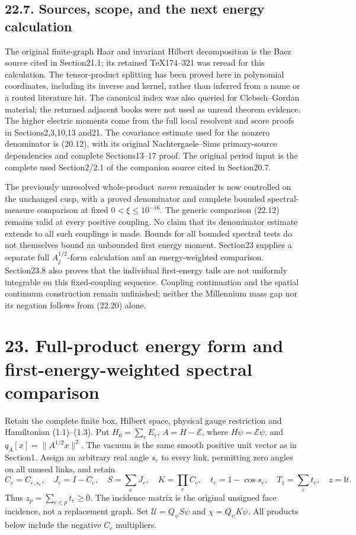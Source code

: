 \documentclass[
]{article}
\begin{document}
\subsection{22.7. Sources, scope, and the next energy
calculation}\label{sources-scope-and-the-next-energy-calculation}

The original finite-graph Haar and invariant Hilbert decomposition is
the Baez source cited in Section21.1; its retained TeX174--321 was
reread for this calculation. The tensor-product splitting has been
proved here in polynomial coordinates, including its inverse and kernel,
rather than inferred from a name or a routed literature hit. The
canonical index was also queried for Clebsch--Gordan material; the
returned adjacent books were not used as unread theorem evidence. The
higher electric moments come from the full local resolvent and score
proofs in Sections2,3,10,13 and21. The covariance estimate used for the
nonzero denominator is (20.12), with its original Nachtergaele--Sims
primary-source dependencies and complete Sections13--17 proof. The
original period input is the complete used Section2/2.1 of the companion
source cited in Section20.7.

The previously unresolved whole-product \emph{norm} remainder is now
controlled on the unchanged cusp, with a proved denominator and complete
bounded spectral-measure comparison at fixed \(0<\xi\le10^{-16}\). The
generic comparison (22.12) remains valid at every positive coupling. No
claim that its denominator estimate extends to all such couplings is
made. Bounds for all bounded spectral tests do not themselves bound an
unbounded first energy moment. Section23 supplies a separate full
\(A_j^{1/2}\)-form calculation and an energy-weighted comparison.
Section23.8 also proves that the individual first-energy tails are not
uniformly integrable on this fixed-coupling sequence. Coupling
continuation and the spatial continuum construction remain unfinished;
neither the Millennium mass gap nor its negation follows from (22.20)
alone.

\section{23. Full-product energy form and first-energy-weighted spectral
comparison}\label{full-product-energy-form-and-first-energy-weighted-spectral-comparison}

Retain the complete finite box, Hilbert space, physical gauge
restriction and Hamiltonian (1.1)--(1.3). Put \(H_0=\sum_eE_e\),
\(A=H-\mathcal E\), where \(H\psi=\mathcal E\psi\), and
\(q_A[x]=\|A^{1/2}x\|^2\). The vacuum is the same smooth positive unit
vector as in Section1. Assign an arbitrary real angle \(s_e\) to every
link, permitting zero angles on all unused links, and retain \[
C_e=C_{e,s_e},\quad J_e=I-C_e,\quad
S=\sum_eJ_e,\quad K=\prod_eC_e,\quad
t_e=1-\cos s_e,\quad T_1=\sum_et_e,\quad z=\mathsf It.
\tag{23.1}
\] Thus \(z_p=\sum_{e\in p}t_e\ge0\). The incidence matrix is the
original unsigned face incidence, not a replacement graph. Set
\(\mathcal U=Q_\psi S\psi\) and \(\chi=Q_\psi K\psi\). All products
below include the negative \(C_e\) multipliers.
\end{document}
